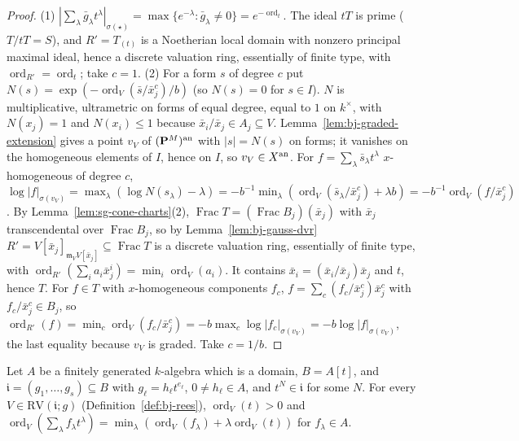 \begin{proof}
(1) $|\sum_\lambda\bar g_\lambda t^\lambda|_{\sigma(\star)}=\max\{e^{-\lambda}:\bar g_\lambda\ne0\}=e^{-\operatorname{ord}_t}$. The ideal $tT$ is prime
($T/tT=S$), and $R'=T_{(t)}$ is a Noetherian local domain with nonzero principal maximal ideal, hence a discrete valuation
ring, essentially of finite type, with $\operatorname{ord}_{R'}=\operatorname{ord}_t$; take $c=1$.
(2) For a form $s$ of degree $c$ put $N(s)=\exp(-\operatorname{ord}_V(\bar s/\bar x_j^c)/b)$ (so $N(s)=0$ for $s\in I$). $N$ is multiplicative,
ultrametric on forms of equal degree, equal to $1$ on $k^\times$, with $N(x_j)=1$ and $N(x_i)\le1$ because
$\bar x_i/\bar x_j\in A_j\subseteq V$. Lemma~\ref{lem:bj-graded-extension} gives a point $v_V$ of $(\mathbf{P}^M)^{\mathrm{an}}$ with $|s|=N(s)$ on forms; it
vanishes on the homogeneous elements of $I$, hence on $I$, so $v_V\in X^{\mathrm{an}}$. For $f=\sum_\lambda\bar s_\lambda t^\lambda$ $x$-homogeneous of degree
$c$, $\log|f|_{\sigma(v_V)}=\max_\lambda(\log N(s_\lambda)-\lambda)=-b^{-1}\min_\lambda(\operatorname{ord}_V(\bar s_\lambda/\bar x_j^c)+\lambda b)=-b^{-1}\operatorname{ord}_V(f/\bar x_j^c)$.
By Lemma~\ref{lem:sg-cone-charts}(2), $\operatorname{Frac}T=(\operatorname{Frac}B_j)(\bar x_j)$ with $\bar x_j$ transcendental over $\operatorname{Frac}B_j$, so by
Lemma~\ref{lem:bj-gauss-dvr} $R'=V[\bar x_j]_{\mathfrak m_VV[\bar x_j]}\subseteq\operatorname{Frac}T$ is a discrete valuation ring, essentially of finite type,
with $\operatorname{ord}_{R'}(\sum_ia_i\bar x_j^i)=\min_i\operatorname{ord}_V(a_i)$. It contains $\bar x_i=(\bar x_i/\bar x_j)\bar x_j$ and $t$, hence $T$. For $f\in T$ with
$x$-homogeneous components $f_c$, $f=\sum_c(f_c/\bar x_j^c)\bar x_j^c$ with $f_c/\bar x_j^c\in B_j$, so
$\operatorname{ord}_{R'}(f)=\min_c\operatorname{ord}_V(f_c/\bar x_j^c)=-b\max_c\log|f_c|_{\sigma(v_V)}=-b\log|f|_{\sigma(v_V)}$, the last equality because $v_V$ is graded.
Take $c=1/b$.
\end{proof}

\begin{lemma}\label{lem:sg-rees-invariant}
\leanok
{}
Let $A$ be a finitely generated $k$-algebra which is a domain, $B=A[t]$, and $\mathfrak i=(g_1,\dots,g_s)\subseteq B$ with $g_\ell=h_\ell t^{e_\ell}$,
$0\ne h_\ell\in A$, and $t^N\in\mathfrak i$ for some $N$. For every $V\in\mathrm{RV}(\mathfrak i;g)$ (Definition~\ref{def:bj-rees}),
$\operatorname{ord}_V(t)>0$ and $\operatorname{ord}_V(\sum_\lambda f_\lambda t^\lambda)=\min_\lambda(\operatorname{ord}_V(f_\lambda)+\lambda\operatorname{ord}_V(t))$ for $f_\lambda\in A$.
\end{lemma}

